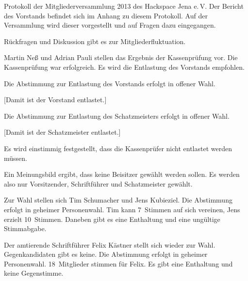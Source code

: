 \documentclass[ngerman]{scrartcl}
\begin{document}
\begin{Protokoll}{Protokoll der Mitgliederversammlung 2013 des Hackspace
    Jena e.\,V.}
Der Bericht des Vorstands befindet sich im Anhang zu diesem
Protokoll. Auf der Versammlung wird dieser vorgestellt und auf Fragen
dazu eingegangen.

Rückfragen und Diskussion gibt es zur Mitgliederfluktuation.


Martin Neß und Adrian Pauli stellen das Ergebnis der Kassenprüfung
vor.  Die Kassenprüfung war erfolgreich. Es wird die Entlastung des
Vorstands empfohlen.


Die Abstimmung zur Entlastung des Vorstands erfolgt in offener Wahl.
\begin{Abstimmung}
  [Damit ist der Vorstand entlastet.]
\end{Abstimmung}



Die Abstimmung zur Entlastung des Schatzmeisters erfolgt in offener Wahl.
\begin{Abstimmung}
  [Damit ist der Schatzmeister entlastet.]
\end{Abstimmung}

Es wird einstimmig festgestellt, dass die Kassenprüfer nicht entlastet werden müssen.


Ein Meinungsbild ergibt, dass keine Beisitzer gewählt werden sollen. Es
werden also nur Vorsitzender, Schriftführer und Schatzmeister gewählt.


Zur Wahl stellen sich Tim Schumacher und Jens Kubieziel. Die
Abstimmung erfolgt in geheimer Personenwahl. Tim kann 7~Stimmen auf
sich vereinen, Jens erzielt 10~Stimmen. Daneben gibt es eine
Enthaltung und eine ungültige Stimmabgabe.



Der amtierende Schriftführer Felix Kästner stellt sich wieder zur
Wahl. Gegenkandidaten gibt es keine. Die Abstimmung erfolgt in
geheimer Personenwahl. 18~Mitglieder stimmen für Felix. Es gibt eine
Enthaltung und keine Gegenstimme.


\end{Protokoll}
\end{document}
